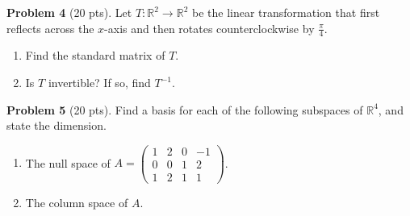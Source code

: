 \documentclass{amsart}
\begin{document}
\bigskip

\textbf{Problem 4} (20 pts). Let $T: \mathbb{R}^2 \to \mathbb{R}^2$ be the linear transformation that first reflects across the $x$-axis and then rotates counterclockwise by $\frac{\pi}{4}$.
\begin{enumerate}
    \item[(a)] Find the standard matrix of $T$.
    \item[(b)] Is $T$ invertible? If so, find $T^{-1}$.
\end{enumerate}

\bigskip

\textbf{Problem 5} (20 pts). Find a basis for each of the following subspaces of $\mathbb{R}^4$, and state the dimension.
\begin{enumerate}
    \item[(a)] The null space of $A = \begin{pmatrix}1&2&0&-1\\0&0&1&2\\1&2&1&1\end{pmatrix}$.
    \item[(b)] The column space of $A$.
\end{enumerate}
\end{document}
